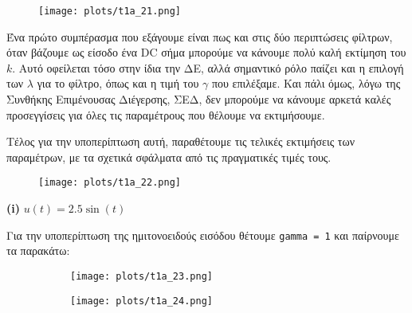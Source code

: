 \documentclass[12pt]{article} %
\numberwithin{equation}{section}  %
\begin{document}
\begin{figure}[h!]
    \centering
    \texttt{[image: plots/t1a\_21.png]}
    \caption{}
    \label{fig:t1a_21}
\end{figure}

Ένα πρώτο συμπέρασμα που εξάγουμε είναι πως και στις δύο περιπτώσεις φίλτρων, όταν βάζουμε ως είσοδο ένα DC σήμα μπορούμε να κάνουμε πολύ καλή εκτίμηση του $k$. Αυτό οφείλεται τόσο στην ίδια την ΔΕ, αλλά σημαντικό ρόλο παίζει και η επιλογή των $\lambda$ για το φίλτρο, όπως και η τιμή του $\gamma$ που επιλέξαμε.  
Και πάλι όμως, λόγω της Συνθήκης Επιμένουσας Διέγερσης, ΣΕΔ, δεν μπορούμε να κάνουμε αρκετά καλές προσεγγίσεις για όλες τις παραμέτρους που θέλουμε να εκτιμήσουμε. 

Τέλος για την υποπερίπτωση αυτή, παραθέτουμε τις τελικές εκτιμήσεις των παραμέτρων, με τα σχετικά σφάλματα από τις πραγματικές τιμές τους.

\begin{figure}[h!]
    \centering
    \texttt{[image: plots/t1a\_22.png]}
    \caption{}
    \label{fig:t1a_22}
\end{figure}



\begin{center}
    \textbf{(i)} $u(t) = 2.5 \sin(t)$
\end{center}

\noindent Για την υποπερίπτωση της ημιτονοειδούς εισόδου θέτουμε \texttt{gamma = 1} και παίρνουμε τα παρακάτω:

\begin{figure}[h!]
    \begin{subfigure}{0.45\textwidth}
        \centering
        \texttt{[image: plots/t1a\_23.png]}
        \caption{}
        \label{fig:t1a_23}
    \end{subfigure}
    \hfill
    \begin{subfigure}{0.45\textwidth}
        \centering
        \texttt{[image: plots/t1a\_24.png]}
        \caption{}
        \label{fig:t1a_24}
    \end{subfigure}

\end{figure}

\vspace{-15pt}
\end{document}
